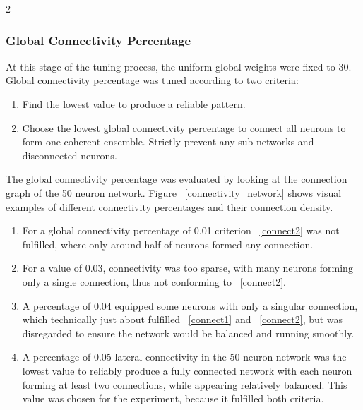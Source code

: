 \documentclass[12pt,a4paper]{article}
\begin{document}
\begin{multicols}{2}
        \subsubsection{Global Connectivity Percentage}
            At this stage of the tuning process, the uniform global weights were fixed to 30. Global connectivity percentage was tuned according to two criteria: 
            \begin{enumerate}[label=(\arabic*), leftmargin=*, rightmargin=1em, itemsep=10pt, parsep=0pt, topsep=10pt, partopsep=0pt]
                \item\label{connect1} Find the lowest value to produce a reliable pattern.
                \item\label{connect2} Choose the lowest global connectivity percentage to connect all neurons to form one coherent ensemble. Strictly prevent any sub-networks and disconnected neurons.
            \end{enumerate}
            The global connectivity percentage was evaluated by looking at the connection graph of the 50 neuron network. Figure ~\ref{connectivity_network} shows visual examples of different connectivity percentages and their connection density.
            \begin{enumerate}[label=\alph*), labelwidth=1.5em, labelsep=1.5pt, leftmargin=1em, itemindent=0pt, rightmargin=0pt, itemsep=5pt, parsep=0pt, topsep=2pt, partopsep=0pt]
                \item\label{percent1} For a global connectivity percentage of 0.01 criterion ~\ref{connect2} was not fulfilled, where only around half of neurons formed any connection.
                \item\label{percent2} For a value of 0.03, connectivity was too sparse, with many neurons forming only a single connection, thus not conforming to ~\ref{connect2}.
                \item\label{percent3} A percentage of 0.04 equipped some neurons with only a singular connection, which technically just about fulfilled ~\ref{connect1} and ~\ref{connect2}, but was disregarded to ensure the network would be balanced and running smoothly.
                \item\label{percent4} A percentage of 0.05 lateral connectivity in the 50 neuron network was the lowest value to reliably produce a fully connected network with each neuron forming at least two connections, while appearing relatively balanced. This value was chosen for the experiment, because it fulfilled both criteria.
            \end{enumerate}



\end{multicols}
\end{document}
